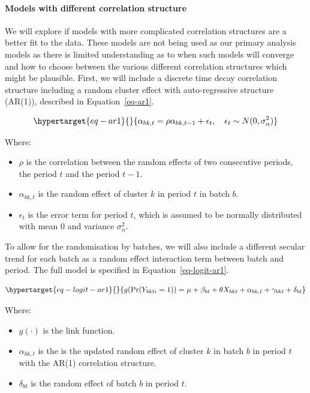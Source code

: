 \documentclass[
]{scrartcl}
\let\oldparagraph\paragraph
\renewcommand{\paragraph}[1]{\oldparagraph{#1}\mbox{}}
\providecommand{\tightlist}{%
  \setlength{\itemsep}{0pt}\setlength{\parskip}{0pt}}\usepackage{longtable,booktabs,array}
\begin{document}
\hypertarget{models-with-different-correlation-structure}{%
\paragraph{Models with different correlation
structure}\label{models-with-different-correlation-structure}}

We will explore if models with more complicated correlation structures
are a better fit to the data. These models are not being used as our
primary analysis models as there is limited understanding as to when
such models will converge and how to choose between the various
different correlation structures which might be plausible. First, we
will include a discrete time decay correlation structure including a
random cluster effect with auto-regressive structure (AR(1)), described
in Equation~\ref{eq-ar1}.

\begin{equation}\protect\hypertarget{eq-ar1}{}{
\alpha_{bk, t} = \rho \alpha_{bk, t-1} + \epsilon_{t}, \quad \epsilon_{t} \sim N(0, \sigma^2_\alpha)
}\label{eq-ar1}\end{equation}

Where:

\begin{itemize}
\tightlist
\item
  \(\rho\) is the correlation between the random effects of two
  consecutive periods, the period \(t\) and the period \(t-1\).
\item
  \(\alpha_{bk, t}\) is the random effect of cluster \(k\) in period
  \(t\) in batch \(b\).
\item
  \(\epsilon_{t}\) is the error term for period \(t\), which is assumed
  to be normally distributed with mean 0 and variance
  \(\sigma^2_\alpha\).
\end{itemize}

To allow for the randomisation by batches, we will also include a
different secular trend for each batch as a random effect interaction
term between batch and period. The full model is specified in
Equation~\ref{eq-logit-ar1}.

\begin{equation}\protect\hypertarget{eq-logit-ar1}{}{
g(\text{Pr}(Y_{bkti} = 1)) = \mu + \beta_{bt} + \theta X_{bkt} + \alpha_{bk,t} + \gamma_{bkt} + \delta_{bt}
}\label{eq-logit-ar1}\end{equation}

Where:

\begin{itemize}
\tightlist
\item
  \(g(\cdot)\) is the link function.
\item
  \(\alpha_{bk,t}\) is the is the updated random effect of cluster \(k\)
  in batch \(b\) in period \(t\) with the AR(1) correlation structure.
\item
  \(\delta_{bt}\) is the random effect of batch \(b\) in period \(t\).
\end{itemize}
\end{document}
